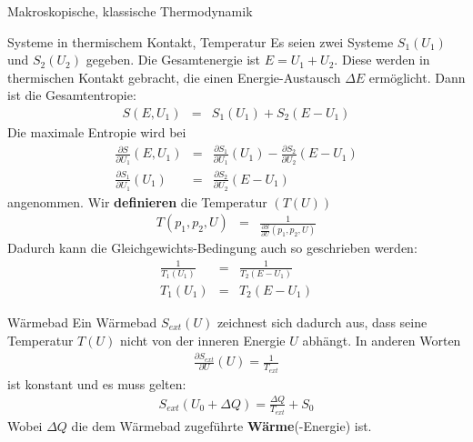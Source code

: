 \begin{chapter}{\titlestr}
\begin{section}{Makroskopische, klassische Thermodynamik}
\begin{subsection}{Systeme in thermischem Kontakt, Temperatur}
Es seien zwei Systeme $S_1(U_1)$ und $S_2(U_2)$ gegeben. Die Gesamtenergie ist $E=U_1+U_2$. Diese werden in thermischen Kontakt gebracht, die einen Energie-Austausch $\Delta E$ ermöglicht. Dann ist die Gesamtentropie:
\begin{eqnarray*}
S(E,U_1) &=& S_1(U_1)+S_2(E-U_1)
\end{eqnarray*}
Die maximale Entropie wird bei
\begin{eqnarray*}
\frac{\partial S}{\partial U_1}(E,U_1) &=& \frac{\partial S_1}{\partial U_1}(U_1)-\frac{\partial S_2}{\partial U_2}(E-U_1)\\
\frac{\partial S_1}{\partial U_1}(U_1) &=& \frac{\partial S_2}{\partial U_2}(E-U_1)
\end{eqnarray*}
angenommen.
Wir \textbf{definieren} die Temperatur $(T(U))$
\begin{eqnarray*}
T(p_1,p_2,U) &=& \frac{1}{\frac{\partial S}{\partial U}(p_1,p_2,U)}
\end{eqnarray*}
Dadurch kann die Gleichgewichts-Bedingung auch so geschrieben werden:
\begin{eqnarray*}
\frac{1}{T_1(U_1)} &=& \frac{1}{T_2(E-U_1)}\\
T_1(U_1) &=& T_2(E-U_1)
\end{eqnarray*}
\end{subsection}

\begin{subsection}{Wärmebad}
Ein Wärmebad $S_{ext}(U)$ zeichnest sich dadurch aus, dass seine Temperatur $T(U)$ nicht von der inneren Energie $U$ abhängt. In anderen Worten
\begin{eqnarray*}
\frac{\partial S_{ext}}{\partial U}(U) = \frac{1}{T_{ext}}
\end{eqnarray*}
ist konstant und es muss gelten:
\begin{eqnarray*}
S_{ext}(U_0+\Delta Q) = \frac{\Delta Q}{T_{ext}}+S_0
\end{eqnarray*}
Wobei $\Delta Q$ die dem Wärmebad zugeführte \textbf{Wärme}(-Energie) ist.
\end{subsection}


\end{section}
\end{chapter}
